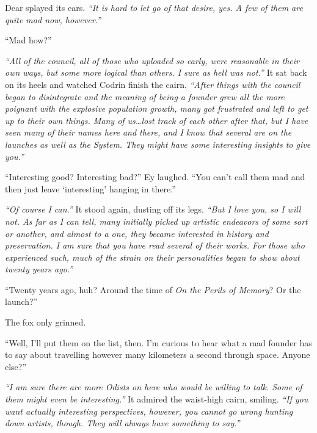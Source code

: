 Dear splayed its ears. \emph{``It is hard to let go of that desire, yes. A few of them are quite mad now, however.''}

``Mad how?''

\emph{``All of the council, all of those who uploaded so early, were reasonable in their own ways, but some more logical than others. I sure as hell was not.''} It sat back on its heels and watched Codrin finish the cairn. \emph{``After things with the council began to disintegrate and the meaning of being a founder grew all the more poignant with the explosive population growth, many got frustrated and left to get up to their own things. Many of us\ldots lost track of each other after that, but I have seen many of their names here and there, and I know that several are on the launches as well as the System. They might have some interesting insights to give you.''}

``Interesting good? Interesting bad?'' Ey laughed. ``You can't call them mad and then just leave `interesting' hanging in there.''

\emph{``Of course I can.''} It stood again, dusting off its legs. \emph{``But I love you, so I will not. As far as I can tell, many initially picked up artistic endeavors of some sort or another, and almost to a one, they became interested in history and preservation. I am sure that you have read several of their works. For those who experienced such, much of the strain on their personalities began to show about twenty years ago.''}

``Twenty years ago, huh? Around the time of \emph{On the Perils of Memory}? Or the launch?''

The fox only grinned.

``Well, I'll put them on the list, then. I'm curious to hear what a mad founder has to say about travelling however many kilometers a second through space. Anyone else?''

\emph{``I am sure there are more Odists on here who would be willing to talk. Some of them might even be interesting.''} It admired the waist-high cairn, smiling. \emph{``If you want actually interesting perspectives, however, you cannot go wrong hunting down artists, though. They will always have something to say.''}
